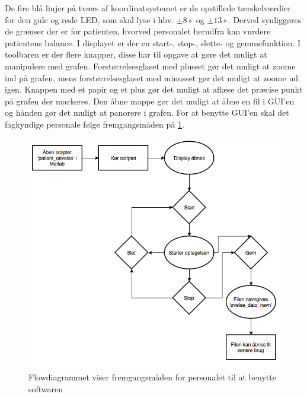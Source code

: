 De fire blå linjer på tværs af koordinatsystemet er de opstillede tærskelværdier for den gule og røde LED, som skal lyse i hhv. $\pm 8\circ$ og $\pm 13\circ$. Derved synliggøres de grænser der er for patienten, hvorved personalet herudfra kan vurdere patientens balance. I displayet er der en start-, stop-, slette- og gemmefunktion.
I toolbaren er der flere knapper, disse har til opgave at gøre det muligt at manipulere med grafen. Forstørrelsesglaset med plusset gør det muligt at zoome ind på grafen, mens forstørrelsesglaset med minusset gør det muligt at zoome ud igen. Knappen med et papir og et plus gør det muligt at aflæse det præcise punkt på grafen der markeres. Den åbne mappe gør det muligt at åbne en fil i GUI'en og hånden gør det muligt at panorere i grafen.
For at benytte GUI'en skal det fagkyndige personale følge fremgangsmåden på \ref{Fig:fremgangsmåde_software}.
\begin{figure}[H] 
	\centering 
	\includegraphics[scale=0.5]{figures/cProblemloesning/Software_flowdiagram.PNG}
	\caption{Flowdiagrammet viser fremgangsmåden for personalet til at benytte softwaren}
	\label{Fig:fremgangsmåde_software}
\end{figure}




